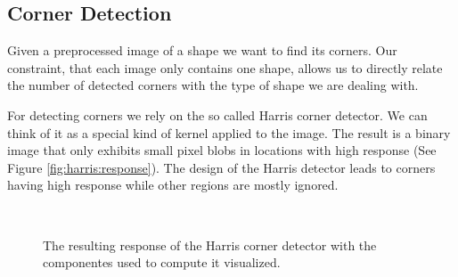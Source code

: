 \documentclass[conference]{IEEEtran}
\begin{document}
\subsection{Corner Detection}
\label{sub:corner_detection}
Given a preprocessed image of a shape we want to find its corners. 
Our constraint, that each image only contains one shape, 
allows us to directly relate the number of detected corners with the type of shape we are dealing with. 

For detecting corners we rely on the so called Harris\cite{Harris88acombined} corner detector. 
We can think of it as a special kind of kernel applied to the image. 
The result is a binary image that only exhibits small pixel blobs in locations with high response (See Figure \ref{fig:harris:response}).
The design of the Harris detector leads to corners having high response while other regions 
are mostly ignored. 

\begin{figure}[ht!]%
\centering
{}
\\
\caption{The resulting response of the Harris corner detector with the componentes
used to compute it visualized.}
\label{fig:harris}
\end{figure}
\end{document}
